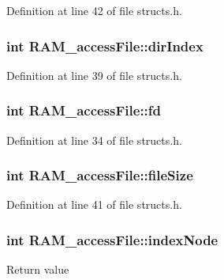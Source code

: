 Definition at line 42 of file structs.\-h.

\hypertarget{struct_r_a_m__access_file_aed38abd6dad05bf93626ba21ef15fd24}{
\subsubsection[{dir\-Index}]{\setlength{\rightskip}{0pt plus 5cm}int R\-A\-M\-\_\-access\-File\-::dir\-Index}}\label{struct_r_a_m__access_file_aed38abd6dad05bf93626ba21ef15fd24}


Definition at line 39 of file structs.\-h.

\hypertarget{struct_r_a_m__access_file_a2eb9b6645a513c67c97117a00f31f039}{
\subsubsection[{fd}]{\setlength{\rightskip}{0pt plus 5cm}int R\-A\-M\-\_\-access\-File\-::fd}}\label{struct_r_a_m__access_file_a2eb9b6645a513c67c97117a00f31f039}


Definition at line 34 of file structs.\-h.

\hypertarget{struct_r_a_m__access_file_a60a3744c8b18b285bb3ca28fdc287043}{
\subsubsection[{file\-Size}]{\setlength{\rightskip}{0pt plus 5cm}int R\-A\-M\-\_\-access\-File\-::file\-Size}}\label{struct_r_a_m__access_file_a60a3744c8b18b285bb3ca28fdc287043}


Definition at line 41 of file structs.\-h.

\hypertarget{struct_r_a_m__access_file_af142abebca241fdf69a9835cdd769ec6}{
\subsubsection[{index\-Node}]{\setlength{\rightskip}{0pt plus 5cm}int R\-A\-M\-\_\-access\-File\-::index\-Node}}\label{struct_r_a_m__access_file_af142abebca241fdf69a9835cdd769ec6}
Return value 

